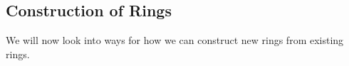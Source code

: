 








\subsection{Construction of Rings}
We will now look into ways for how we can construct new rings from existing rings. 


